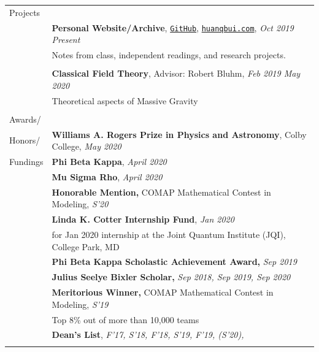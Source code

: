 \documentclass[10pt]{article}
\begin{document}
\begin{longtable}{ l p{14.7cm}   }
	
	\large{Projects}		& \\ 
	& \textbf{Personal Website/Archive}, \href{https://github.com/huanium/huanium}{\texttt{GitHub}},  \href{https://huanqbui.com}{\texttt{huanqbui.com}}, \textit{Oct 2019 \textendash Present} \\
	& Notes from class, independent readings, and research projects.\\
	& \\
		
	
	& \textbf{Classical Field Theory}, Advisor: Robert Bluhm, \textit{Feb 2019 \textendash May 2020}\\
	& Theoretical aspects of Massive Gravity\\
	& \\

     					
     					



\large{Awards/}    	& \\
\large{Honors/}		& \textbf{Williams A. Rogers Prize in Physics and Astronomy}, Colby College, \textit{May 2020} \\
\large{Fundings}	& \textbf{Phi Beta Kappa}, \textit{April 2020} \\
& \textbf{Mu Sigma Rho}, \textit{April 2020}\\
& \textbf{Honorable Mention,}  COMAP Mathematical Contest in Modeling, \textit{S'20}\\
& \textbf{Linda K. Cotter Internship Fund}, \textit{Jan 2020}\\
& for Jan 2020 internship at the Joint Quantum Institute (JQI), College Park, MD\\
& \textbf{Phi Beta Kappa Scholastic Achievement Award,} \textit{Sep 2019}\\
& \textbf{Julius Seelye Bixler Scholar,} \textit{Sep 2018, Sep 2019, Sep 2020}\\
& \textbf{Meritorious Winner,}  COMAP Mathematical Contest in Modeling, \textit{S'19}\\
& Top 8\% out of more than 10,000 teams\\
& \textbf{Dean’s List}, \textit{F'17, S'18, F'18, S'19, F'19, (S'20), }\\
&\\
		

\end{longtable}
\end{document}
